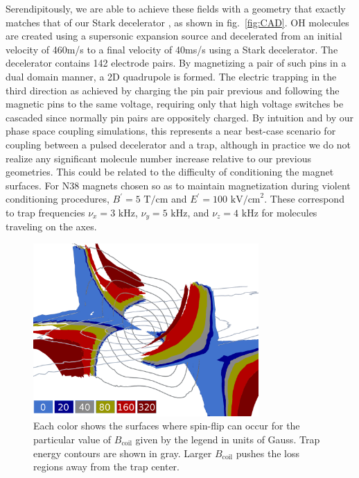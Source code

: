 \documentclass[%
 reprint,
 amsmath,amssymb,
 aps,
prl,
]{revtex4-1}
\begin{document}
Serendipitously, we are able to achieve these fields with a geometry that exactly matches that of our Stark decelerator \cite{Bochinski2003}, as shown in fig.~\ref{fig:CAD}. OH molecules are created using a supersonic expansion source and decelerated from an initial velocity of 460m/s to a final velocity of 40ms/s using a Stark decelerator. The decelerator contains 142 electrode pairs. By magnetizing a pair of such pins in a dual domain manner, a 2D quadrupole is formed. The electric trapping in the third direction as achieved by charging the pin pair previous and following the magnetic pins to the same voltage, requiring only that high voltage switches be cascaded since normally pin pairs are oppositely charged. By intuition and by our phase space coupling simulations, this represents a near best-case scenario for coupling between a pulsed decelerator and a trap, although in practice we do not realize any significant molecule number increase relative to our previous geometries. This could be related to the difficulty of conditioning the magnet surfaces. For N38 magnets chosen so as to maintain magnetization during violent conditioning procedures, $B^\prime=5\text{ T/cm}$ and $E^\prime=100 \text{ kV/cm}^2$. These correspond to trap frequencies $\nu_x=3\text{ kHz}$, $\nu_y=5\text{ kHz}$, and $\nu_z=4\text{ kHz}$ for molecules traveling on the axes.

\begin{figure}
\includegraphics[width=86mm]{Loss_Surface_Chunks_recolored_legend.png}%
\caption{
Each color shows the surfaces where spin-flip can occur for the particular value of $B_\text{coil}$ given by the legend in units of Gauss. Trap energy contours are shown in gray. Larger $B_\text{coil}$ pushes the loss regions away from the trap center.
\label{fig:LSurfs}}
\end{figure}
\end{document}
